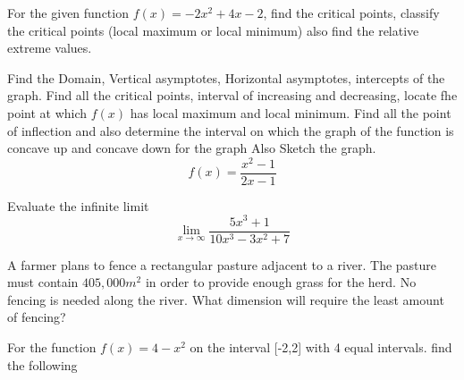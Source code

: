\documentclass[11pt]{exam}
\begin{document}
\begin{questions}

\addpoints
\question[10] For the given function $f(x)=-2x^2+4x-2$, find the critical points, classify the critical points (local maximum or local minimum) also find the relative extreme values. 






\newpage
\addpoints
\question[20] Find the Domain, Vertical asymptotes, Horizontal asymptotes, intercepts of the graph. Find all the critical points, interval of increasing and decreasing, locate fhe point at which $f(x)$ has local maximum and local minimum. Find all the point of inflection and also determine the interval on which the graph of the function is concave up and concave down for the graph Also Sketch the graph. \[f(x)=\frac{x^2-1}{2x-1}\]





\newpage
\addpoints
\question[5] Evaluate the infinite limit
\[ \lim\limits_{x\to \infty} \frac{5x^3+1}{10x^3-3x^2+7} \]






\vspace{8cm}
\addpoints
\question[10]A farmer plans to fence a rectangular pasture adjacent to a river. The pasture must contain $405,000 m^2$ in order to provide enough grass for the herd. No fencing is needed along the river. What dimension will require the least amount of fencing?



\vspace{8cm}
\newpage
\addpoints
\question[15] For the function $f(x)=4-x^2$ on the interval [-2,2] with 4 equal intervals. find the following 




\end{questions}
\end{document}
